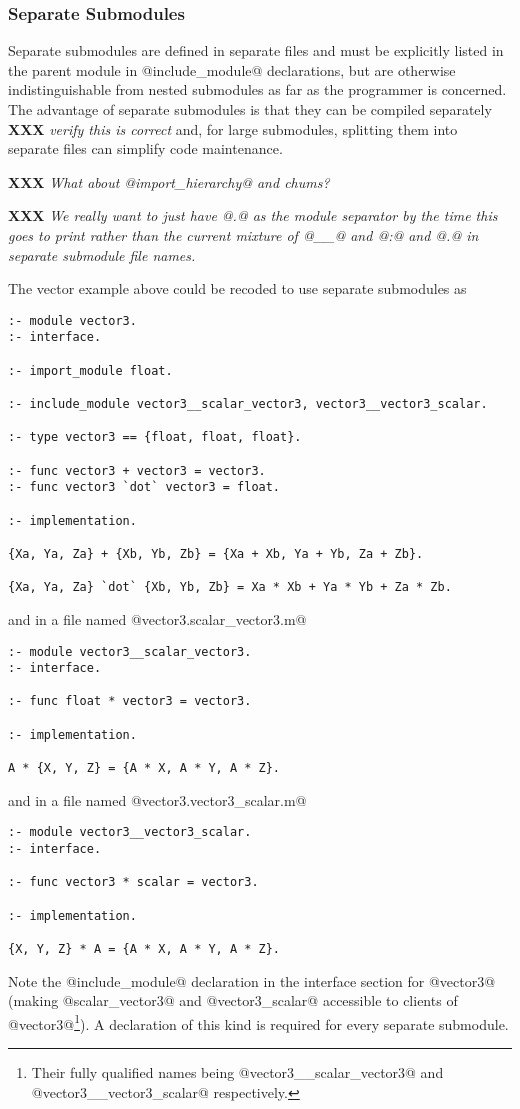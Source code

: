 \documentclass[a4paper,11pt,notitlepage,onecolumn]{article}
\newcommand{\XXX}[1]%
{{\small\textbf{XXX} \emph{#1}}}
\begin{document}
\subsubsection{Separate Submodules}

Separate submodules are defined in separate files and must be explicitly
listed in the parent module in @include_module@ declarations, but are 
otherwise indistinguishable from nested submodules as far as the
programmer is concerned.  The advantage of separate submodules is that
they can be compiled separately \XXX{verify this is correct} and, for
large submodules, splitting them into separate files can simplify code
maintenance.

\XXX{What about @import\_hierarchy@ and chums?}

\XXX{We really want to just have @.@ as the module separator by the time
this goes to print rather than the current mixture of @\_\_@ and @:@ and
@.@ in separate submodule file names.}

The vector example above could be recoded to use separate submodules as
\begin{verbatim}
:- module vector3.
:- interface.

:- import_module float.

:- include_module vector3__scalar_vector3, vector3__vector3_scalar.

:- type vector3 == {float, float, float}.

:- func vector3 + vector3 = vector3.
:- func vector3 `dot` vector3 = float.
    
:- implementation.

{Xa, Ya, Za} + {Xb, Yb, Zb} = {Xa + Xb, Ya + Yb, Za + Zb}.

{Xa, Ya, Za} `dot` {Xb, Yb, Zb} = Xa * Xb + Ya * Yb + Za * Zb.
\end{verbatim}
and in a file named @vector3.scalar_vector3.m@
\begin{verbatim}
:- module vector3__scalar_vector3.
:- interface.

:- func float * vector3 = vector3.

:- implementation.

A * {X, Y, Z} = {A * X, A * Y, A * Z}.
\end{verbatim}
and in a file named @vector3.vector3_scalar.m@
\begin{verbatim}
:- module vector3__vector3_scalar.
:- interface.

:- func vector3 * scalar = vector3.

:- implementation.

{X, Y, Z} * A = {A * X, A * Y, A * Z}.
\end{verbatim}
Note the @include_module@ declaration in the interface section for
@vector3@ (making @scalar_vector3@ and @vector3_scalar@ accessible to
clients of @vector3@\footnote{Their fully qualified names being
@vector3\_\_scalar\_vector3@ and @vector3\_\_vector3\_scalar@
respectively.}).  A declaration of this kind is required for every
separate submodule.
\end{document}
